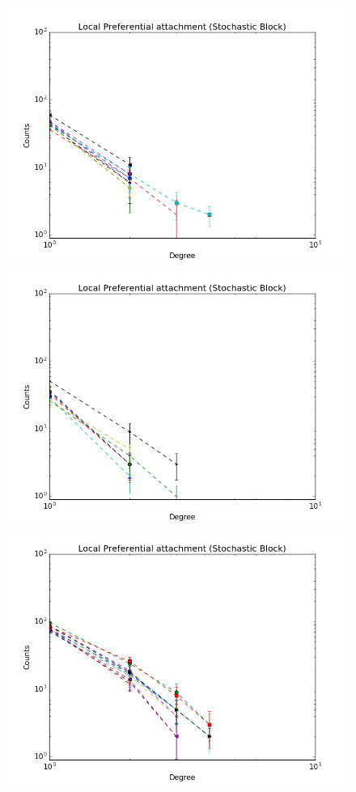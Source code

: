 \begin{figure}[ht]
	\endminipage
		\vspace{-0.29cm}
	\includegraphics[scale=0.27]{img/expe/1_mmsb/figure_2}
	\endminipage
	\includegraphics[scale=0.27]{img/expe/2_mmsb/figure_2} 
	\endminipage
	\includegraphics[scale=0.27]{img/expe/3_mmsb/figure_2}

\end{figure}
